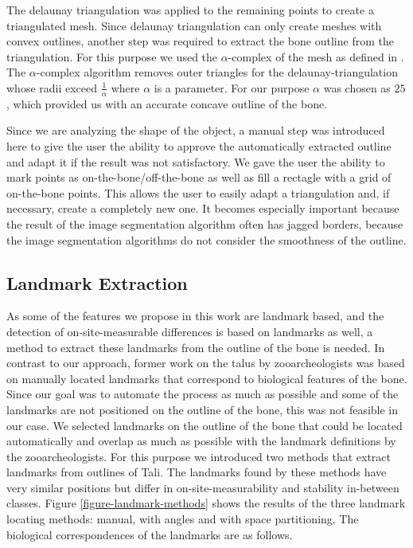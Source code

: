 \documentclass[pdftex,12pt,a4paper]{report}
\begin{document}
The delaunay triangulation was applied to the remaining points to create a triangulated mesh. Since delaunay
triangulation can only create meshes with convex outlines, another step was required to extract the bone outline
from the triangulation. For this purpose we used the $\alpha$-complex of the mesh as defined in \cite{akkirajualpha}.
The $\alpha$-complex algorithm removes outer triangles for the delaunay-triangulation whose radii exceed
$\frac{1}{\alpha}$ where $\alpha$ is a parameter. For our purpose $\alpha$ was chosen as $25$, which provided us with
an accurate concave outline of the bone.

Since we are analyzing the shape of the object, a manual step was introduced here to give the user the ability to
approve the automatically extracted outline and adapt it if the result was not satisfactory. We gave the user the
ability to mark points as on-the-bone/off-the-bone as well as fill a rectagle with a grid of on-the-bone points.
This allows the user to easily adapt a triangulation and, if necessary, create a completely new one. It becomes
especially important because the result of the image segmentation algorithm often has jagged borders, because the
image segmentation algorithms do not consider the smoothness of the outline.

\subsection{Landmark Extraction}
\label{sub:landmarks}

As some of the features we propose in this work are landmark based, and the detection of on-site-measurable differences
is based on landmarks as well, a method to extract these landmarks from the outline of the bone is needed. In contrast to
our approach, former work on the talus by zooarcheologists was based on manually located landmarks that correspond to
biological features of the bone. Since our goal was to automate the process as much as possible and some of the landmarks
are not positioned on the outline of the bone, this was not feasible in our case. We selected landmarks on the outline
of the bone that could be located automatically and overlap as much as possible with the landmark definitions by the
zooarcheologists. For this purpose we introduced two methods that extract landmarks from outlines of Tali. The landmarks
found by these methods have very similar positions but differ in on-site-measurability and stability in-between classes.
Figure \ref{figure-landmark-methods} shows the results of the three landmark locating methods: manual, with angles and
with space partitioning. The biological correspondences of the landmarks are as follows.
\end{document}
